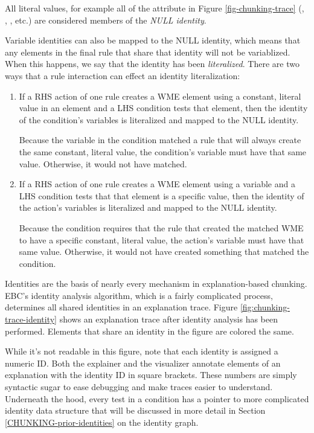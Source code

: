 All literal values, for example all of the attribute in Figure \ref{fig-chunking-trace} (, , , etc.) are considered members of the \textit{NULL identity}.

Variable identities can also be mapped to the NULL identity, which means that any elements in the final rule that share that identity will not be variablized. When this happens, we say that the identity has been \textit{literalized}.  There are two ways that a rule interaction can effect an identity literalization:

\begin{enumerate}
	\item If a RHS action of one rule creates a WME element using a constant, literal value in an element and a LHS condition tests that element, then the identity of the condition's variables is literalized and mapped to the NULL identity. 

	Because the variable in the condition matched a rule that will always create the same constant, literal value, the condition's variable must have that same value.  Otherwise, it would not have matched.
	\vspace{-6pt}
	
	\item If a RHS action of one rule creates a WME element using a variable and a LHS condition tests that that element is a specific value, then the identity of the action's variables is literalized and mapped to the NULL identity. 

	Because the condition requires that the rule that created the matched WME to have a specific constant, literal value, the action's variable must have that same value.  Otherwise, it would not have created something that matched the condition. 
\end{enumerate}

Identities are the basis of nearly every mechanism in explanation-based chunking.  EBC's identity analysis algorithm, which is a fairly complicated process, determines all shared identities in an explanation trace.  Figure \ref{fig:chunking-trace-identity} shows an explanation trace after identity analysis has been performed.  Elements that share an identity in the figure are colored the same.

While it's not readable in this figure, note that each identity is assigned a numeric ID.  Both the explainer and the visualizer annotate elements of an explanation with the identity ID in square brackets.  These numbers are simply syntactic sugar to ease debugging and make traces easier to understand.  Underneath the hood, every test in a condition has a pointer to more complicated identity data structure that will be discussed in more detail in Section \ref{CHUNKING-prior-identities} on the identity graph. 

